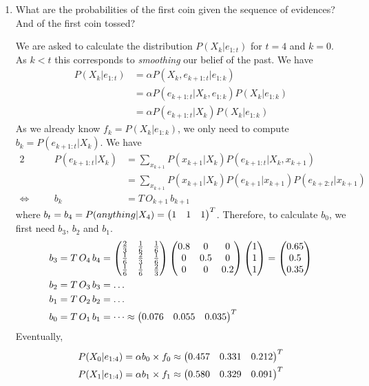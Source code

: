 \documentclass[11pt, a4paper]{article}
\begin{document}
\begin{enumerate}
    \item What are the probabilities of the first coin given the sequence of evidences? And of the first coin tossed?

    \begin{solution}
        We are asked to calculate the distribution $P(X_k | e_{1:t})$ for $t = 4$ and $k = 0$. As $k < t$ this corresponds to \emph{smoothing} our belief of the past. We have
        \begin{align*}
            P(X_k | e_{1:t}) & = \alpha P(X_k, e_{k + 1:t} | e_{1:k}) \\
            & = \alpha P(e_{k + 1:t} | X_k, e_{1:k}) P(X_k | e_{1:k}) \\
            & = \alpha P(e_{k + 1:t} | X_k) P(X_k | e_{1:k})
        \end{align*}
        As we already know $f_k = P(X_k | e_{1:k})$, we only need to compute $b_k = P(e_{k + 1:t} | X_k)$. We have
        \begin{alignat*}{2}
            && P(e_{k + 1:t} | X_k) & = \sum_{x_{k + 1}} P(x_{k + 1} | X_k) P(e_{k + 1:t} | X_k, x_{k + 1}) \\
            &&& = \sum_{x_{k + 1}} P(x_{k + 1} | X_k) P(e_{k + 1} | x_{k + 1}) P(e_{k + 2:t} | x_{k + 1}) \\
            \Leftrightarrow \quad && b_k & = T \, O_{k + 1} \, b_{k + 1}
        \end{alignat*}
        where $b_t = b_4 = P(anything | X_4) = \begin{pmatrix}1 & 1 & 1\end{pmatrix}^T$. Therefore, to calculate $b_0$, we first need $b_3$, $b_2$ and $b_1$.
        \begin{align*}
            b_3 & = T \, O_{4} \, b_4 = \begin{pmatrix}
                \frac{2}{3} & \frac{1}{6} & \frac{1}{6} \\
                \frac{1}{6} & \frac{2}{3} & \frac{1}{6} \\
                \frac{1}{6} & \frac{1}{6} & \frac{2}{3}
            \end{pmatrix} \begin{pmatrix}0.8 & 0 & 0 \\ 0 & 0.5 & 0 \\ 0 & 0 & 0.2\end{pmatrix} \begin{pmatrix}1 \\ 1 \\ 1\end{pmatrix} = \begin{pmatrix}0.65 \\ 0.5 \\ 0.35\end{pmatrix} \\
            b_2 & = T \, O_{3} \, b_3 = \dots \\
            b_1 & = T \, O_{2} \, b_2 = \dots \\
            b_0 & = T \, O_{1} \, b_1 = \dots \approx \begin{pmatrix}0.076 & 0.055 & 0.035\end{pmatrix}^T
        \end{align*}
        Eventually,
        \begin{align*}
            P(X_0 | e_{1:4}) & = \alpha b_0 \times f_0 \approx \begin{pmatrix}0.457 & 0.331 & 0.212\end{pmatrix}^T \\
            P(X_1 | e_{1:4}) & = \alpha b_1 \times f_1 \approx \begin{pmatrix}0.580 & 0.329 & 0.091\end{pmatrix}^T
        \end{align*}
    \end{solution}


\end{enumerate}
\end{document}
